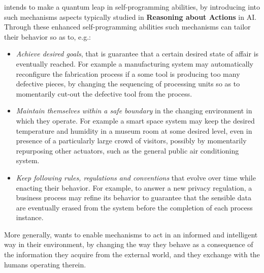 \project intends to make a quantum leap in  self-programming abilities, by introducing into such mechanisms aspects typically studied  in 
\textbf{Reasoning about Actions} in AI.
Through these  enhanced self-programming abilities such
mechanisms can tailor their behavior so as to, e.g.:
\begin{itemize}
\item \emph{Achieve desired goals}, that is guarantee that a certain
  desired state of affair is eventually reached.  For example a
  manufacturing system may automatically reconfigure the fabrication
  process if a some tool is producing too many defective pieces, by
  changing the sequencing of processing units so as to momentarily
  cut-out the defective tool from the process.
\item \emph{Maintain themselves within a safe boundary} in the
  changing environment in which they operate.  For example a smart
  space system may keep the desired temperature and humidity in a
  museum room at some desired level, even in presence of a particularly large
  crowd of visitors, possibly by momentarily repurposing other
  actuators, such as the general public air conditioning system.
\item \emph{Keep following rules, regulations and
conventions} that evolve over time while enacting their behavior.  
For example, to answer a new privacy regulation, a business process may refine its behavior to guarantee that the sensible data
  are eventually erased from the system before the completion of each process instance.
\end{itemize}
More generally, \project wants to enable
mechanisms to act in an informed and intelligent way in their
environment, by changing the way they behave as a consequence of the
information they acquire from the external world, and they exchange
with the humans operating therein.

